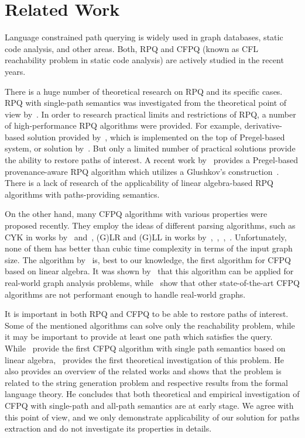 \section{Related Work}

Language constrained path querying is widely used in graph databases, static code analysis, and other areas.
Both, RPQ and CFPQ (known as CFL reachability problem in static code analysis) are actively studied in the recent years.

There is a huge number of theoretical research on RPQ and its specific cases.
RPQ with single-path semantics was investigated from the theoretical point of view by~\cite{barrett2000formal}.
In order to research practical limits and restrictions of RPQ, a number of high-performance RPQ algorithms were provided.
For example, derivative-based solution provided by~\cite{10.1145/2949689.2949711}, which is implemented on the top of Pregel-based system, or solution by~\cite{10.1007/978-3-642-31235-9_12}.
But only a limited number of practical solutions provide the ability to restore paths of interest.
A recent work by~\cite{Wang2019} provides a Pregel-based provenance-aware RPQ algorithm which utilizes a Glushkov's construction~\citep{Glushkov1961}.
There is a lack of research of the applicability of linear algebra-based RPQ algorithms with paths-providing semantics.

On the other hand, many CFPQ algorithms with various properties were proposed recently.
They employ the ideas of different parsing algorithms, such as CYK in works by~\cite{hellingsRelational} and~\cite{8249039}, (G)LR and (G)LL in works by~\cite{10.1007/978-3-319-41579-6_22},~\cite{Grigorev:2017:CPQ:3166094.3166104},~\cite{10.1007/978-3-319-91662-0_17},~\cite{Medeiros:2018:EEC:3167132.3167265}.
Unfortunately, none of them has better than cubic time complexity in terms of the input graph size.
The algorithm by~\cite{Azimov:2018:CPQ:3210259.3210264} is, best to our knowledge, the first algorithm for CFPQ based on linear algebra.
It was shown by~\cite{10.1145/3398682.3399163} that this algorithm can be applied for real-world graph analysis problems, while~\cite{Kuijpers:2019:ESC:3335783.3335791} show that other state-of-the-art CFPQ algorithms are not performant enough to handle real-world graphs.

It is important in both RPQ and CFPQ to be able to restore paths of interest.
Some of the mentioned algorithms can solve only the reachability problem, while it may be important to provide at least one path which satisfies the query.
While~\cite{10.1145/3398682.3399163} provide the first CFPQ algorithm with single path semantics based on linear algebra,~\cite{HellSinglePath} provides the first theoretical investigation of this problem.
He also provides an overview of the related works and shows that the problem is related to the string generation problem and respective results from the formal language theory.
He concludes that both theoretical and empirical investigation of CFPQ with single-path and all-path semantics are at early stage.
We agree with this point of view, and we only demonstrate applicability of our solution for paths extraction and do not investigate its properties in details.


